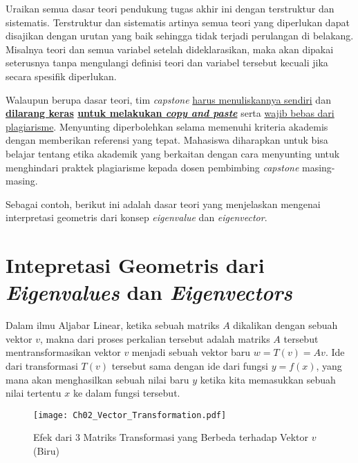 Uraikan semua dasar teori pendukung tugas akhir ini dengan terstruktur dan sistematis. Terstruktur dan sistematis artinya semua teori yang diperlukan dapat disajikan dengan urutan yang baik sehingga tidak terjadi perulangan di belakang. Misalnya teori dan semua variabel setelah dideklarasikan, maka akan dipakai seterusnya tanpa mengulangi definisi teori dan variabel tersebut kecuali jika secara spesifik diperlukan. 

Walaupun berupa dasar teori, tim \textit{capstone} \uline{harus menuliskannya sendiri} dan \textbf{\uline{dilarang keras} \uline{untuk melakukan \textit{copy and paste}}} serta \uline{wajib bebas dari plagiarisme}. Menyunting diperbolehkan selama memenuhi kriteria akademis dengan memberikan referensi yang tepat. Mahasiswa diharapkan untuk bisa belajar tentang etika akademik yang berkaitan dengan cara menyunting untuk menghindari praktek plagiarisme kepada dosen pembimbing \textit{capstone} masing-masing.

Sebagai contoh, berikut ini adalah dasar teori yang menjelaskan mengenai interpretasi geometris dari konsep \textit{eigenvalue} dan \textit{eigenvector}.

\section{Intepretasi Geometris dari \textit{Eigenvalues} dan \textit{Eigenvectors}}
\label{sec:Interpretasi_Geometris_Eigenvalue_Eigenvector}

    Dalam ilmu Aljabar Linear, ketika sebuah matriks $A$ dikalikan dengan sebuah vektor $v$, makna dari proses perkalian tersebut adalah matriks $A$ tersebut mentransformasikan vektor $v$ menjadi sebuah vektor baru $w = T(v) = Av$. Ide dari transformasi $T(v)$ tersebut sama dengan ide dari fungsi $y = f(x)$, yang mana akan menghasilkan sebuah nilai baru $y$ ketika kita memasukkan sebuah nilai tertentu $x$ ke dalam fungsi tersebut. 
    
    \begin{figure}[h!]
        \centering
        \texttt{[image: Ch02\_Vector\_Transformation.pdf]}
        \caption{Efek dari 3 Matriks Transformasi yang Berbeda terhadap Vektor $v$ (Biru)}
        \label{fig:Ch02_Vector_Transformation}
    \end{figure}
        

